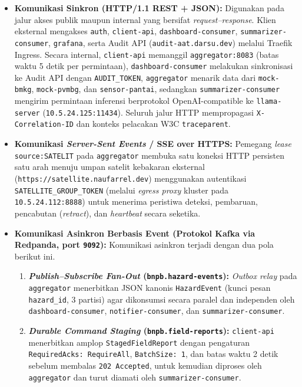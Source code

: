 \begin{itemize}
    \item \textbf{Komunikasi Sinkron (HTTP/1.1 REST + JSON):} Digunakan pada jalur akses publik maupun internal yang bersifat \textit{request--response}. Klien eksternal mengakses \texttt{auth}, \texttt{client-api}, \texttt{dashboard-consumer}, \texttt{summarizer-consumer}, \texttt{grafana}, serta Audit API (\texttt{audit-aat.darsu.dev}) melalui Traefik Ingress. Secara internal, \texttt{client-api} memanggil \texttt{aggregator:8083} (batas waktu 5 detik per permintaan), \texttt{dashboard-consumer} melakukan sinkronisasi ke Audit API dengan \texttt{AUDIT\_TOKEN}, \texttt{aggregator} menarik data dari \texttt{mock-bmkg}, \texttt{mock-pvmbg}, dan \texttt{sensor-pantai}, sedangkan \texttt{summarizer-consumer} mengirim permintaan inferensi berprotokol OpenAI-compatible ke \texttt{llama-server} (\texttt{10.5.24.125:11434}). Seluruh jalur HTTP mempropagasi \texttt{X-Correlation-ID} dan konteks pelacakan W3C \texttt{traceparent}.
    \item \textbf{Komunikasi \textit{Server-Sent Events} / SSE over HTTPS:} Pemegang \textit{lease} \texttt{source:SATELIT} pada \texttt{aggregator} membuka satu koneksi HTTP persisten satu arah menuju umpan satelit kebakaran eksternal (\nolinkurl{https://satellite.naufarrel.dev}) menggunakan autentikasi \texttt{SATELLITE\_GROUP\_TOKEN} (melalui \textit{egress proxy} kluster pada \texttt{10.5.24.112:8888}) untuk menerima peristiwa deteksi, pembaruan, pencabutan (\textit{retract}), dan \textit{heartbeat} secara seketika.
    \item \textbf{Komunikasi Asinkron Berbasis Event (Protokol Kafka via Redpanda, port \texttt{9092}):} Komunikasi asinkron terjadi dengan dua pola berikut ini.
    \begin{enumerate}
        \item \textbf{\textit{Publish--Subscribe Fan-Out} (\texttt{bnpb.hazard-events}):} \textit{Outbox relay} pada \texttt{aggregator} menerbitkan JSON kanonis \texttt{HazardEvent} (kunci pesan \texttt{hazard\_id}, 3 partisi) agar dikonsumsi secara paralel dan independen oleh \texttt{dashboard-consumer}, \texttt{notifier-consumer}, dan \texttt{summarizer-consumer}.
        \item \textbf{\textit{Durable Command Staging} (\texttt{bnpb.}\allowbreak\texttt{field-reports}):} \texttt{client-api} menerbitkan amplop \texttt{StagedFieldReport} dengan pengaturan \texttt{RequiredAcks:}\allowbreak\texttt{ RequireAll}, \texttt{BatchSize: 1}, dan batas waktu 2 detik sebelum membalas \texttt{202 Accepted}, untuk kemudian diproses oleh \texttt{aggregator} dan turut diamati oleh \texttt{summarizer-consumer}.

\end{enumerate}
\end{itemize}
